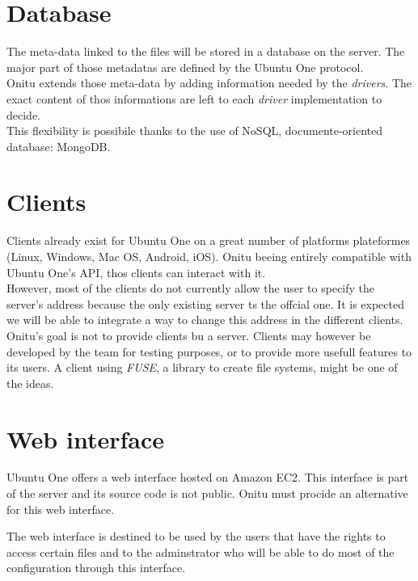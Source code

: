 \section{Database}
The meta-data linked to the files will be stored in a database on the server. The major part of those metadatas are defined by the Ubuntu One protocol.\\

Onitu extends those meta-data by adding information needed by the \textit{drivers}. The exact content of thos informations are left to each \textit{driver} implementation to decide.\\

This flexibility is possibile thanks to the use of NoSQL, documente-oriented database: MongoDB.

\section{Clients}
Clients already exist for Ubuntu One on a great number of platforms plateformes (Linux, Windows, Mac OS, Android, iOS). Onitu beeing entirely compatible with Ubuntu One's API, thos clients can interact with it.\\

However, most of the clients do not currently allow the user to specify the server's address because the only existing server ts the offcial one. It is expected we will be able to integrate a way to change this address in the different clients.\\

Onitu's goal is not to provide clients bu a server. Clients may however be developed by the team for testing purposes, or to provide more usefull features to its users. A client using \textit{FUSE}, a library to create file systems, might be one of the ideas.\\

\section{Web interface}
Ubuntu One offers a web interface hosted on Amazon EC2. This interface is part of the server and its source code is not public. Onitu must procide an alternative for this web interface.

The web interface is destined to be used by the users that have the rights to access certain files and to the adminstrator who will be able to do most of the configuration through this interface.\\

